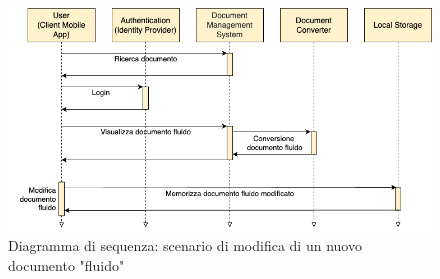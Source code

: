 \begin{figure}[H]
\centering
\includegraphics[width=1\textwidth]{img/tesi-2-Use-case2.drawio.png}
\caption{Diagramma di sequenza: scenario di modifica di un nuovo documento "fluido"}
\end{figure}


